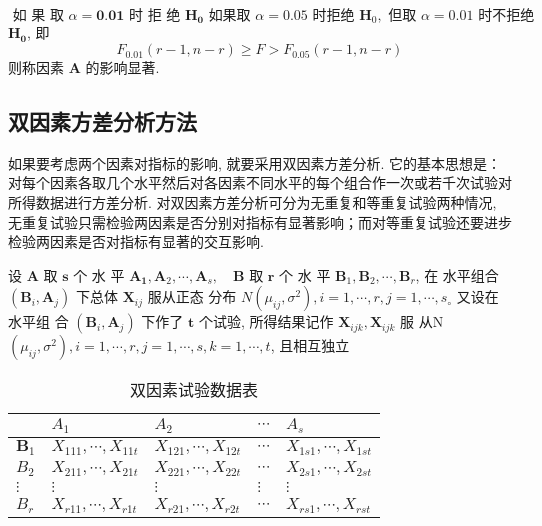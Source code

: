$\text { 如 果 取 } \alpha=\mathbf{0 . 0 1} \text { 时 拒 绝 } \boldsymbol{H}_{\mathbf{0}}
\text { 如果取 } \alpha=0.05 \text { 时拒绝 } \boldsymbol{H}_{0}, \text { 但取 } \alpha=0.01 \text { 时不拒绝 }$
\( \boldsymbol{H}_{\mathbf{0}} \), 即
$$
F_{0.01}(r-1, n-r) \geq F>F_{0.05}(r-1, n-r)
$$
则称因素 \( \boldsymbol{A} \) 的影响显著. 

\subsection{双因素方差分析方法}

如果要考虑两个因素对指标的影响, 就要采用双因素方差分析. 它的基本思想是：对每个因素各取几个水平然后对各因素不同水平的每个组合作一次或若千次试验对所得数据进行方差分析. 对双因素方差分析可分为无重复和等重复试验两种情况, 无重复试验只需检验两因素是否分别对指标有显著影响；而对等重复试验还要进步检验两因素是否对指标有显著的交互影响. 

设 \( \boldsymbol{A} \) 取 \( \boldsymbol{s} \) 个 水 平 \( \boldsymbol{A}_{\mathbf{1}}, \boldsymbol{A}_{2}, \cdots, \boldsymbol{A}_{s}, \quad \boldsymbol{B} \) 取 \( \boldsymbol{r} \) 个 水 平
\( \boldsymbol{B}_{1}, \boldsymbol{B}_{2}, \cdots, \boldsymbol{B}_{r} \), 在 水平组合 \( \left(\boldsymbol{B}_{i}, \boldsymbol{A}_{j}\right) \) 下总体 \( \boldsymbol{X}_{i j} \) 服从正态
分布 \( N\left(\mu_{i j}, \sigma^{2}\right), i=1, \cdots, r, j=1, \cdots, s_{\circ} \) 又设在水平组
合 \( \left(\boldsymbol{B}_{i}, \boldsymbol{A}_{j}\right) \) 下作了 \( \boldsymbol{t} \) 个试验, 所得结果记作 \( \boldsymbol{X}_{i j k}, \boldsymbol{X}_{i j k} \) 服
从N \( \left(\mu_{i j}, \sigma^{2}\right), i=1, \cdots, r, j=1, \cdots, s, k=1, \cdots, t \), 且相互独立

\begin{table}
        \caption{双因素试验数据表}
        \begin{tabular}{l|llll}
        \hline & \( A_{1} \) & \( A_{2} \) & \( \cdots \) & \( A_{s} \) \\
        \hline \( \boldsymbol{B}_{1} \) & \( X_{111}, \cdots, X_{11 t} \) & \( X_{121}, \cdots, X_{12 t} \) & \( \cdots \) & \( X_{1 s 1}, \cdots, X_{1 s t} \) \\
        \( B_{2} \) & \( X_{211}, \cdots, X_{21 t} \) & \( X_{221}, \cdots, X_{22 t} \) & \( \cdots \) & \( X_{2 s 1}, \cdots, X_{2 s t} \) \\
        \( \vdots \) & \( \vdots \) & \( \vdots \) & \( \vdots \) & \( \vdots \) \\
        \( B_{r} \) & \( X_{r 11}, \cdots, X_{r 1 t} \) & \( X_{r 21}, \cdots, X_{r 2 t} \) & \( \cdots \) & \( X_{r s 1}, \cdots, X_{r s t} \) \\
        \hline
        \end{tabular}
\end{table}

